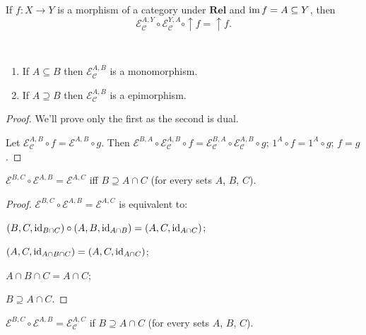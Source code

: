 \begin{cor}
  If $f : X \rightarrow Y$ is a morphism of a category under
  $\mathbf{Rel}$ and $\operatorname{im} f = A \subseteq Y$, then
  \[ \mathcal{E}_{\mathcal{C}}^{A,Y} \circ \mathcal{E}_{\mathcal{C}}^{Y,A}
  \circ \uparrow f = \uparrow f. \]
\end{cor}

\begin{prop}
  ~  
  \begin{enumerate}
    \item If $A \subseteq B$ then $\mathcal{E}_{\mathcal{C}}^{A,B}$ is a
    monomorphism.
    
    \item If $A \supseteq B$ then $\mathcal{E}_{\mathcal{C}}^{A,B}$ is a
    epimorphism.
  \end{enumerate}
\end{prop}

\begin{proof}
  We'll prove only the first as the second is dual.
  
  Let $\mathcal{E}_{\mathcal{C}}^{A,B} \circ f = \mathcal{E}^{A,B} \circ g$. Then
  $\mathcal{E}^{B,A} \circ \mathcal{E}_{\mathcal{C}}^{A,B}
  \circ f = \mathcal{E}_{\mathcal{C}}^{B,A} \circ \mathcal{E}_{\mathcal{C}}^{A,B} \circ g$;
  $1^A \circ f = 1^A \circ g$; $f = g$.
\end{proof}

\begin{prop}
  $\mathcal{E}^{B,C} \circ \mathcal{E}^{A,B} = \mathcal{E}^{A,C}$
  iff $B \supseteq A \cap C$ (for every sets $A$, $B$, $C$).
\end{prop}

\begin{proof}
  $\mathcal{E}^{B,C} \circ \mathcal{E}^{A,B} = \mathcal{E}^{A,C}$
  is equivalent to:
  
  $(B , C , \operatorname{id}_{B \cap C}) \circ (A , B , \operatorname{id}_{A \cap B}) = (A ,
  C , \operatorname{id}_{A \cap C})$;
  
  $(A , C , \operatorname{id}_{A \cap B \cap C}) = (A , C , \operatorname{id}_{A \cap C})$;
  
  $A \cap B \cap C = A \cap C$;
  
  $B \supseteq A \cap C$.
\end{proof}

\begin{cor}
  $\mathcal{E}^{B,C} \circ \mathcal{E}^{A,B} = \mathcal{E}_{\mathcal{C}}^{A,C}$ if
  $B \supseteq A \cap C$ (for every sets $A$, $B$, $C$).
\end{cor}

